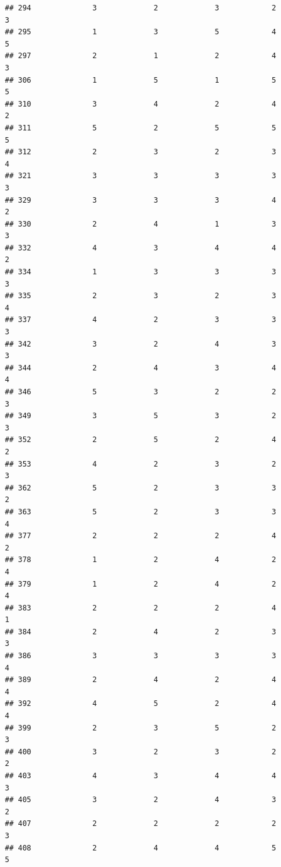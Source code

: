 \documentclass[
]{article}
\begin{document}
\begin{verbatim}
## 294              3             2             3            2          3
## 295              1             3             5            4          5
## 297              2             1             2            4          3
## 306              1             5             1            5          5
## 310              3             4             2            4          2
## 311              5             2             5            5          5
## 312              2             3             2            3          4
## 321              3             3             3            3          3
## 329              3             3             3            4          2
## 330              2             4             1            3          3
## 332              4             3             4            4          2
## 334              1             3             3            3          3
## 335              2             3             2            3          4
## 337              4             2             3            3          3
## 342              3             2             4            3          3
## 344              2             4             3            4          4
## 346              5             3             2            2          3
## 349              3             5             3            2          3
## 352              2             5             2            4          2
## 353              4             2             3            2          3
## 362              5             2             3            3          2
## 363              5             2             3            3          4
## 377              2             2             2            4          2
## 378              1             2             4            2          4
## 379              1             2             4            2          4
## 383              2             2             2            4          1
## 384              2             4             2            3          3
## 386              3             3             3            3          4
## 389              2             4             2            4          4
## 392              4             5             2            4          4
## 399              2             3             5            2          3
## 400              3             2             3            2          2
## 403              4             3             4            4          3
## 405              3             2             4            3          2
## 407              2             2             2            2          3
## 408              2             4             4            5          5

\end{verbatim}
\end{document}
